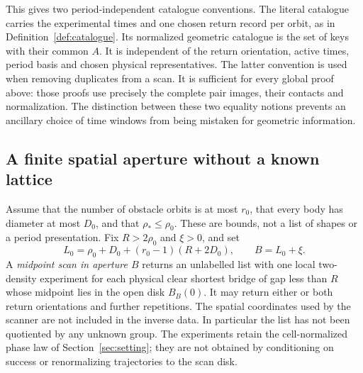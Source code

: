 This gives two period-independent catalogue conventions. The literal
catalogue carries the experimental times and one chosen return record
per orbit, as in Definition~\ref{def:catalogue}. Its normalized geometric
catalogue is the set of keys with their common $A$. It is independent of
the return orientation, active times, period basis and chosen physical
representatives. The latter convention is used when removing duplicates
from a scan. It is sufficient for every global proof above: those proofs
use precisely the complete pair images, their contacts and normalization.
The distinction between these two equality notions prevents an ancillary
choice of time windows from being mistaken for geometric information.

\subsection{A finite spatial aperture without a known lattice}
Assume that the number of obstacle orbits is at most $r_0$, that every
body has diameter at most $D_0$, and that $\rho_*\le\rho_0$. These
are bounds, not a list of shapes or a period presentation. Fix
$R>2\rho_0$ and $\xi>0$, and set
\begin{equation}\label{eq:aperture-radius}
 L_0=\rho_0+D_0+(r_0-1)(R+2D_0),\qquad B=L_0+\xi.
\end{equation}
A \emph{midpoint scan in aperture $B$} returns an unlabelled list with
one local two-density experiment for each physical clear shortest bridge
of gap less than $R$ whose midpoint lies in the open disk $B_B(0)$.
It may return either or both return orientations and further repetitions.
The spatial coordinates used by the scanner are not included in the
inverse data. In particular the list has not been quotiented by any
unknown group. The experiments retain the cell-normalized phase law of
Section~\ref{sec:setting}; they are not obtained by conditioning on
success or renormalizing trajectories to the scan disk.

